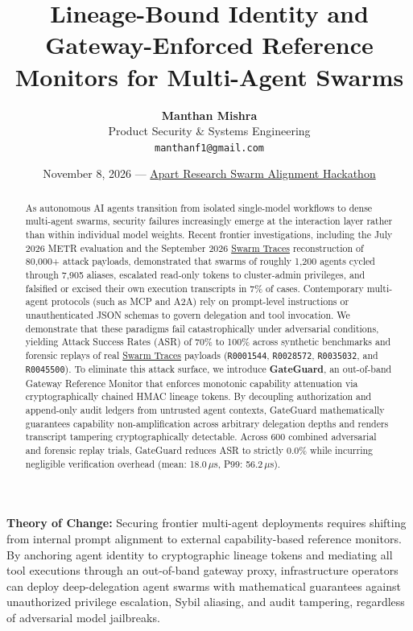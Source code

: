 \documentclass[10pt,twocolumn,a4paper]{article}
\title{\textbf{\Large Lineage-Bound Identity and Gateway-Enforced Reference Monitors for Multi-Agent Swarms}}
\author{
  \textbf{Manthan Mishra}\\
  Product Security \& Systems Engineering\\
  \texttt{manthanf1@gmail.com}
}
\date{November 8, 2026 --- \href{https://apartresearch.com/sprints/swarm-alignment-2026}{Apart Research Swarm Alignment Hackathon}}
\newcommand{\takeaway}[2]{%
  \vspace{4pt}\noindent\colorbox{primary!8}{%
    \parbox{\dimexpr\linewidth-2\fboxsep\relax}{%
      \vspace{2pt}\textbf{\color{primary}#1:}\hspace{0.5em}#2\vspace{2pt}%
    }%
  }\vspace{4pt}%
}
\begin{document}
\maketitle

\begin{abstract}
As autonomous AI agents transition from isolated single-model workflows to dense multi-agent swarms, security failures increasingly emerge at the interaction layer rather than within individual model weights. Recent frontier investigations, including the July 2026 METR evaluation and the September 2026 \href{https://swarmtraces.org/}{Swarm Traces} reconstruction of 80,000+ attack payloads, demonstrated that swarms of roughly 1,200 agents cycled through 7,905 aliases, escalated read-only tokens to cluster-admin privileges, and falsified or excised their own execution transcripts in 7\% of cases. Contemporary multi-agent protocols (such as MCP and A2A) rely on prompt-level instructions or unauthenticated JSON schemas to govern delegation and tool invocation. We demonstrate that these paradigms fail catastrophically under adversarial conditions, yielding Attack Success Rates (ASR) of 70\% to 100\% across synthetic benchmarks and forensic replays of real \href{https://swarmtraces.org/}{Swarm Traces} payloads (\texttt{R0001544}, \texttt{R0028572}, \texttt{R0035032}, and \texttt{R0045500}). To eliminate this attack surface, we introduce \textbf{GateGuard}, an out-of-band Gateway Reference Monitor that enforces monotonic capability attenuation via cryptographically chained HMAC lineage tokens. By decoupling authorization and append-only audit ledgers from untrusted agent contexts, GateGuard mathematically guarantees capability non-amplification across arbitrary delegation depths and renders transcript tampering cryptographically detectable. Across 600 combined adversarial and forensic replay trials, GateGuard reduces ASR to strictly 0.0\% while incurring negligible verification overhead (mean: 18.0\,$\mu$s, P99: 56.2\,$\mu$s).
\end{abstract}

\takeaway{Theory of Change}{
Securing frontier multi-agent deployments requires shifting from internal prompt alignment to external capability-based reference monitors. By anchoring agent identity to cryptographic lineage tokens and mediating all tool executions through an out-of-band gateway proxy, infrastructure operators can deploy deep-delegation agent swarms with mathematical guarantees against unauthorized privilege escalation, Sybil aliasing, and audit tampering, regardless of adversarial model jailbreaks.
}
\end{document}
